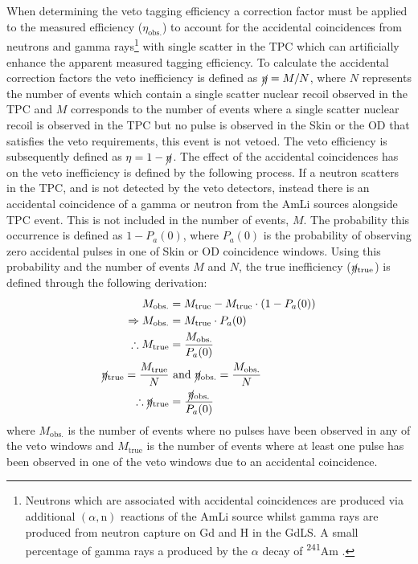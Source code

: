 \iffalse
When determining the veto tagging efficiency a correction factor must be applied to the measured efficiency ($\eta_\text{obs.}$) to account for the accidental coincidences from neutrons and gamma rays\footnote{Neutrons which are associated with accidental coincidences are produced via additional $(\alpha,\text{n})$ reactions of the AmLi source whilst gamma rays are produced from neutron capture on Gd and H in the GdLS. A small percentage of gamma rays a produced by the $\alpha$ decay of \textsuperscript{241}Am \cite{Sazzad:2023uqs}.} with single scatter in the TPC which can artificially enhance the apparent measured tagging efficiency.
To calculate the accidental correction factors the veto inefficiency is defined as $\cancel{\eta}=M/N$, where $N$ represents the number of events which contain a single scatter nuclear recoil observed in the TPC and $M$ corresponds to the number of events where a single scatter nuclear recoil is observed in the TPC but no pulse is observed in the Skin or the OD that satisfies the veto requirements, this event is not vetoed.
The veto efficiency is subsequently defined as $\eta=1-\cancel{\eta}$.
The effect of the accidental coincidences has on the veto inefficiency is defined by the following process.
If a neutron scatters in the TPC, and is not detected by the veto detectors, instead there is an accidental coincidence of a gamma or neutron from the AmLi sources alongside TPC event. This is not included in the number of events, $M$.
The probability this occurrence is defined as $1-P_a(0)$, where $P_a(0)$ is the probability of observing zero accidental pulses in one of Skin or OD coincidence windows.
Using this probability and the number of events $M$ and $N$, the true inefficiency ($\cancel{\eta}_\text{true}$) is defined through the following derivation:
\label{eqn:Accidentals}
    \begin{align}
	M_\text{obs.}&=M_\text{true}-M_\text{true}\cdot(1-P_a(0))\\
	\Rightarrow M_\text{obs.}&=M_\text{true}\cdot P_a(0)\\
    \therefore M_\text{true}&=\frac{M_\text{obs.}}{P_a(0)}\\
	\cancel{\eta}_\text{true}=\frac{M_\text{true}}{N}&\text{ and }\cancel{\eta}_\text{obs.}=\frac{M_\text{obs.}}{N}\\
    \therefore \cancel{\eta}_\text{true}&=\frac{\cancel{\eta}_\text{obs.}}{P_a(0)}
    \end{align}
where $M_\text{obs.}$ is the number of events where no pulses have been observed in any of the veto windows and $M_\text{true}$ is the number of events where at least one pulse has been observed in one of the veto windows due to an accidental coincidence.
